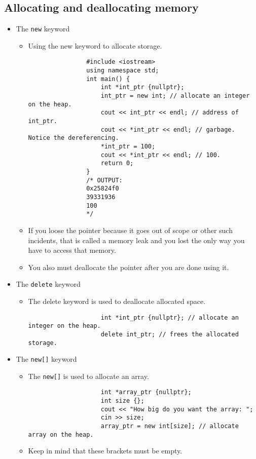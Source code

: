\subsection{Allocating and deallocating memory}
\begin{itemize}
    \item The \texttt{new} keyword
        \begin{itemize}
            \item Using the new keyword to allocate storage.
            \begin{verbatim}
                #include <iostream>
                using namespace std;
                int main() {
                    int *int_ptr {nullptr};
                    int_ptr = new int; // allocate an integer on the heap.
                    cout << int_ptr << endl; // address of int_ptr.
                    cout << *int_ptr << endl; // garbage. Notice the dereferencing.
                    *int_ptr = 100;
                    cout << *int_ptr << endl; // 100.
                    return 0;
                }
                /* OUTPUT:
                0x25824f0
                39331936
                100
                */
            \end{verbatim}
    
        \item If you loose the pointer because it goes out of scope or other such incidents, that is called a memory leak and you lost the only way you have to access that memory.
        \item You also must deallocate the pointer after you are done using it.
        \end{itemize}
    
    \item The \texttt{delete} keyword
        \begin{itemize}
            \item The delete keyword is used to deallocate allocated space.
                \begin{verbatim}
                    int *int_ptr {nullptr}; // allocate an integer on the heap.
                    delete int_ptr; // frees the allocated storage.
                \end{verbatim}
        \end{itemize}
    
    \item The \texttt{new[]} keyword
        \begin{itemize}
            \item The \texttt{new[]} is used to allocate an array.
                \begin{verbatim}
                    int *array_ptr {nullptr};
                    int size {};
                    cout << "How big do you want the array: ";
                    cin >> size;
                    array_ptr = new int[size]; // allocate array on the heap.
                \end{verbatim}
            \item Keep in mind that these brackets must be empty.
        \end{itemize}
    


\end{itemize}
